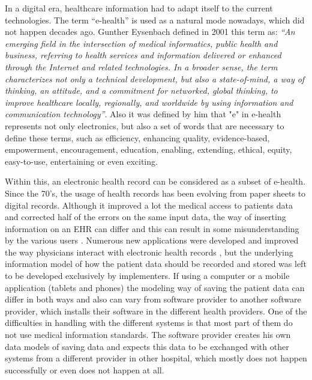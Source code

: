 \documentclass[mim_thesis.tex]{subfiles}
\begin{document}
In a digital era, healthcare information had to adapt itself to the current technologies. The term “e-health” is used as a natural mode nowadays, which did not happen decades ago. \citep{Eysenbach2001} Gunther Eysenbach defined in 2001 this term as: \textit{“An emerging field in the intersection of medical informatics, public health and business, referring to health services and information delivered or enhanced through the Internet and related technologies. In a broader sense, the term characterizes not only a technical development, but also a state-of-mind, a way of thinking, an attitude, and a commitment for networked, global thinking, to improve healthcare locally, regionally, and worldwide by using information and communication technology”}. Also it was defined by him that "e" in e-health represents not only electronics, but also a set of words that are necessary to define these terms, such as efficiency, enhancing quality, evidence-based, empowerment, encouragement, education, enabling, extending, ethical, equity, easy-to-use, entertaining or even exciting.

Within this, an electronic health record can be considered as a subset of e-health. Since the 70’s, the usage of health records has been evolving from paper sheets to digital records. Although it improved a lot the medical access to patients data and corrected half of the errors on the same input data, the way of inserting information on an EHR can differ and this can result in some misunderstanding by the various users \citep{detmer1997computer}. Numerous new applications were developed and improved the way physicians interact with electronic health records \citep{Grandia2017}, but the underlying information model of how the patient data should be recorded and stored was left to be developed exclusively by implementers. If using a computer or a mobile application (tablets and phones) the modeling way of saving the patient data can differ in both ways and also can vary from software provider to another software provider, which installs their software in the different health providers. One of the difficulties in handling with the different systems is that most part of them do not use medical information standards. The software provider creates his own data models of saving data and expects this data to be exchanged with other systems from a different provider in other hospital, which mostly does not happen successfully or even does not happen at all. 
\end{document}
